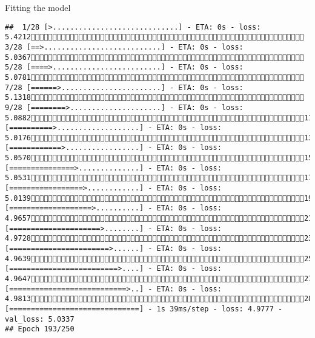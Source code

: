 \documentclass[
  ignorenonframetext,
]{beamer}
\begin{document}
\begin{frame}[fragile]{Fitting the model}
\begin{verbatim}
##  1/28 [>.............................] - ETA: 0s - loss: 5.4212 3/28 [==>...........................] - ETA: 0s - loss: 5.0367 5/28 [====>.........................] - ETA: 0s - loss: 5.0781 7/28 [======>.......................] - ETA: 0s - loss: 5.1318 9/28 [========>.....................] - ETA: 0s - loss: 5.088211/28 [==========>...................] - ETA: 0s - loss: 5.017613/28 [============>.................] - ETA: 0s - loss: 5.057015/28 [===============>..............] - ETA: 0s - loss: 5.053117/28 [=================>............] - ETA: 0s - loss: 5.013919/28 [===================>..........] - ETA: 0s - loss: 4.965721/28 [=====================>........] - ETA: 0s - loss: 4.972823/28 [=======================>......] - ETA: 0s - loss: 4.963925/28 [=========================>....] - ETA: 0s - loss: 4.964727/28 [===========================>..] - ETA: 0s - loss: 4.981328/28 [==============================] - 1s 39ms/step - loss: 4.9777 - val_loss: 5.0337
## Epoch 193/250

\end{verbatim}
\end{frame}
\end{document}
